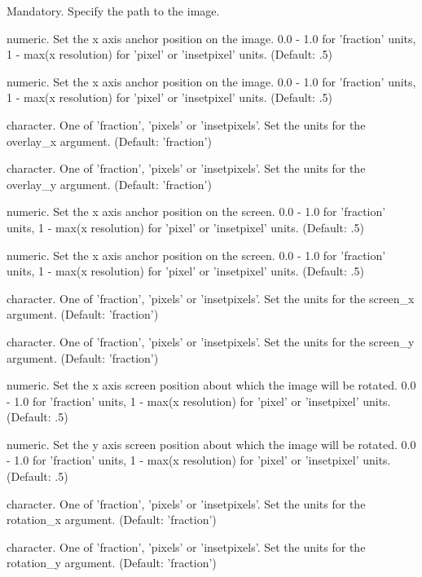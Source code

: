 \documentclass[a4paper]{book}
\begin{document}
\begin{Arguments}
\begin{ldescription}
\item[\code{fn}] Mandatory. Specify the path to the image.
\item[\code{overlay\_x}] numeric. Set the x axis anchor position on the image. 0.0 - 1.0 for 'fraction' units, 1 - max(x resolution) for 'pixel' or 'insetpixel' units. (Default: .5)
\item[\code{overlay\_y}] numeric. Set the x axis anchor position on the image. 0.0 - 1.0 for 'fraction' units, 1 - max(x resolution) for 'pixel' or 'insetpixel' units. (Default: .5)
\item[\code{overlay\_xunit}] character. One of 'fraction', 'pixels' or 'insetpixels'. Set the units for the overlay\_x argument. (Default: 'fraction')
\item[\code{overlay\_yunit}] character. One of 'fraction', 'pixels' or 'insetpixels'. Set the units for the overlay\_y argument. (Default: 'fraction')
\item[\code{screen\_x}] numeric. Set the x axis anchor position on the screen. 0.0 - 1.0 for 'fraction' units, 1 - max(x resolution) for 'pixel' or 'insetpixel' units. (Default: .5)
\item[\code{screen\_y}] numeric. Set the x axis anchor position on the screen. 0.0 - 1.0 for 'fraction' units, 1 - max(x resolution) for 'pixel' or 'insetpixel' units. (Default: .5)
\item[\code{screen\_xunit}] character. One of 'fraction', 'pixels' or 'insetpixels'. Set the units for the screen\_x argument. (Default: 'fraction')
\item[\code{screen\_yunit}] character. One of 'fraction', 'pixels' or 'insetpixels'. Set the units for the screen\_y argument. (Default: 'fraction')
\item[\code{rotation\_x}] numeric. Set the x axis screen position about which the image will be rotated. 0.0 - 1.0 for 'fraction' units, 1 - max(x resolution) for 'pixel' or 'insetpixel' units. (Default: .5)
\item[\code{rotation\_y}] numeric. Set the y axis screen position about which the image will be rotated. 0.0 - 1.0 for 'fraction' units, 1 - max(x resolution) for 'pixel' or 'insetpixel' units. (Default: .5)
\item[\code{rotation\_xunit}] character. One of 'fraction', 'pixels' or 'insetpixels'. Set the units for the rotation\_x argument. (Default: 'fraction')
\item[\code{rotation\_yunit}] character. One of 'fraction', 'pixels' or 'insetpixels'. Set the units for the rotation\_y argument. (Default: 'fraction')

\end{ldescription}
\end{Arguments}
\end{document}

